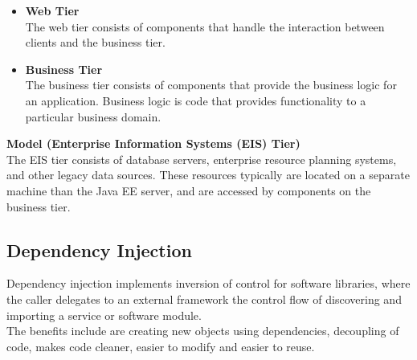 \begin{flushleft}
\begin{itemize}
	\item \textbf{Web Tier}
	\\The web tier consists of components that handle the interaction between clients and the business tier.
	
	\item \textbf{Business Tier}
	\\The business tier consists of components that provide the business logic for an application. Business logic is code that provides functionality to a particular business domain.
\end{itemize}

\textbf{Model (Enterprise Information Systems (EIS) Tier)}\\
The EIS tier consists of database servers, enterprise resource planning systems, and other legacy data sources. These resources typically are located on a separate machine than the Java EE server, and are accessed by components on the business tier.

\end{flushleft}

\subsection*{Dependency Injection}

\begin{flushleft}

Dependency injection implements inversion of control for software libraries, where the caller delegates to an external framework the control flow of discovering and importing a service or software module.\\
The benefits include are creating new objects using dependencies, decoupling of code, makes code cleaner, easier to modify and easier to reuse. 
\end{flushleft}


